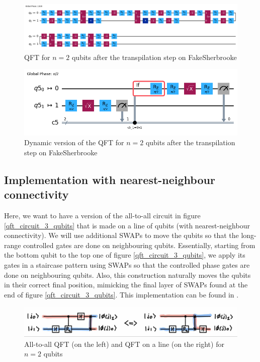 \begin{figure}[H]
    \centering
    \includegraphics*[scale=0.38]{images/transpiled_qft.png}
    \caption{QFT for $n=2$ qubits after the transpilation step on FakeSherbrooke}
    \label{transpiled_qft}
\end{figure}

\begin{figure}[H]
    \centering
    \includegraphics*[scale=0.55]{images/transpiled_dynamic_qft.png}
    \caption{Dynamic version of the QFT for $n=2$ qubits after the transpilation step on FakeSherbrooke}
    \label{transpiled_dynamic_qft}
\end{figure}

\subsection{Implementation with nearest-neighbour connectivity}
Here, we want to have a version of the all-to-all circuit in figure \ref{qft_circuit_3_qubits} that is made on a line of qubits (with nearest-neighbour connectivity). We will use additional SWAPs to move the qubits so that the long-range controlled gates are done on neighbouring qubits. Essentially, starting from the bottom qubit to the top one of figure \ref{qft_circuit_3_qubits}, we apply its gates in a staircase pattern using SWAPs so that the controlled phase gates are done on neighbouring qubits. Also, this construction naturally moves the qubits in their correct final position, mimicking the final layer of SWAPs found at the end of figure \ref{qft_circuit_3_qubits}. This implementation can be found in \cite{Holmes_2020}.

\begin{figure}[H]
    \centering
    \includegraphics*[scale=0.23]{images/qft_line_2_qubits.jpg}
    \caption{All-to-all QFT (on the left) and QFT on a line (on the right) for $n=2$ qubits}
    \label{qft_line_2_qubits}
\end{figure}

